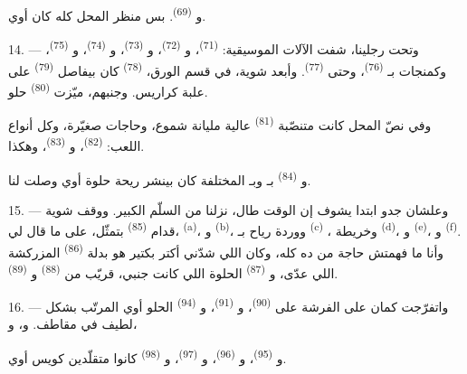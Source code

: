 و \textsuperscript{(69)}. بس منظر المحل كله كان 
أوي.

14. --- وتحت رجلينا، شفت الآلات الموسيقية:  \textsuperscript{(71)}،
و \textsuperscript{(72)}، و \textsuperscript{(73)}،
و \textsuperscript{(74)}، و \textsuperscript{(75)}،
وكمنجات بـ \textsuperscript{(76)}، وحتى 
\textsuperscript{(77)}. وأبعد شوية، في قسم الورق،  \textsuperscript{(78)}
كان بيفاصل  \textsuperscript{(79)} على علبة كراريس. وجنبهم، ميّزت
 \textsuperscript{(80)} حلو.

وفي نصّ المحل كانت متنصّبة  \textsuperscript{(81)} عالية مليانة
شموع، وحاجات صغيّرة، وكل أنواع اللعب:  \textsuperscript{(82)}،
و \textsuperscript{(83)}، وهكذا.

و \textsuperscript{(84)} بـ وبـ
المختلفة كان بينشر ريحة حلوة أوي وصلت لنا.

\VUsaut{3.4mm}
\VUsaut{2.8mm}

15. --- وعلشان جدو ابتدا يشوف إن الوقت طال، نزلنا من السلّم الكبير. ووقف شوية
قدام  \textsuperscript{(85)} بتمثّل، على ما قال لي،
 \textsuperscript{(a)}، و
\textsuperscript{(b)}، ووردة رياح بـ \textsuperscript{(c)}
، وخريطة 
\textsuperscript{(d)}، و \textsuperscript{(e)}، و \textsuperscript{(f)}. وأنا ما فهمتش حاجة من ده كله، وكان اللي شدّني أكتر
بكتير هو بدلة  \textsuperscript{(86)} المزركشة اللي عدّى،
و \textsuperscript{(87)} الحلوة اللي كانت جنبي، قريّب من
 \textsuperscript{(88)} و \textsuperscript{(89)}.

16. --- واتفرّجت كمان على الفرشة على  \textsuperscript{(90)}،
و \textsuperscript{(91)}، و
\textsuperscript{(94)} الحلو أوي المرتّب بشكل لطيف في مقاطف. و،
و،

و \textsuperscript{(95)}، و \textsuperscript{(96)}،
و \textsuperscript{(97)}، و \textsuperscript{(98)} كانوا
متقلّدين كويس أوي.


